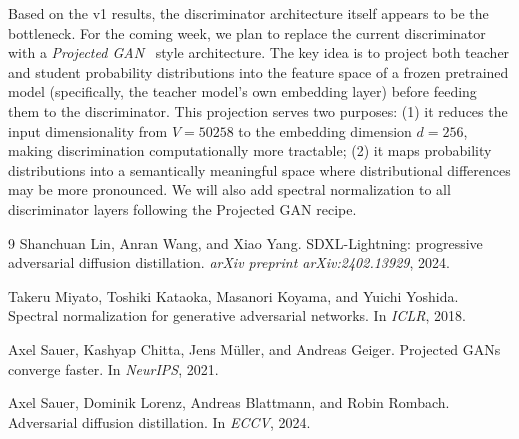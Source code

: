\documentclass{article}
\begin{document}
Based on the v1 results, the discriminator architecture itself appears to be the bottleneck. For the coming week, we plan to replace the current discriminator with a \emph{Projected GAN}~\cite{sauer2021projected} style architecture. The key idea is to project both teacher and student probability distributions into the feature space of a frozen pretrained model (specifically, the teacher model's own embedding layer) before feeding them to the discriminator. This projection serves two purposes: (1) it reduces the input dimensionality from $V = 50258$ to the embedding dimension $d = 256$, making discrimination computationally more tractable; (2) it maps probability distributions into a semantically meaningful space where distributional differences may be more pronounced. We will also add spectral normalization to all discriminator layers following the Projected GAN recipe.

\begin{thebibliography}{9}
Shanchuan Lin, Anran Wang, and Xiao Yang.
SDXL-Lightning: progressive adversarial diffusion distillation.
\textit{arXiv preprint arXiv:2402.13929}, 2024.

Takeru Miyato, Toshiki Kataoka, Masanori Koyama, and Yuichi Yoshida.
Spectral normalization for generative adversarial networks.
In \textit{ICLR}, 2018.

Axel Sauer, Kashyap Chitta, Jens M{\"u}ller, and Andreas Geiger.
Projected GANs converge faster.
In \textit{NeurIPS}, 2021.

Axel Sauer, Dominik Lorenz, Andreas Blattmann, and Robin Rombach.
Adversarial diffusion distillation.
In \textit{ECCV}, 2024.
\end{thebibliography}
\end{document}
